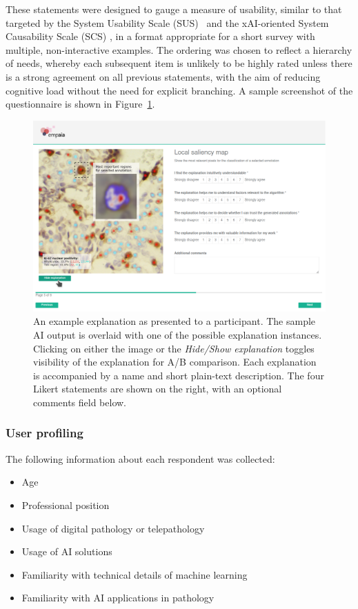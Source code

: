These statements were designed to gauge a measure of usability, similar to that targeted by the System Usability Scale (SUS)~\cite{brooke1996sus} and the xAI-oriented System Causability Scale (SCS) \cite{HolzingerEtAl:2020:QualityOfExplanations}, in a format appropriate for a short survey with multiple, non-interactive examples. The ordering was chosen to reflect a hierarchy of needs, whereby each subsequent item is unlikely to be highly rated unless there is a strong agreement on all previous statements, with the aim of reducing cognitive load without the need for explicit branching. A sample screenshot of the questionnaire is shown in Figure~\ref{fig:examplepage}.

 \begin{figure}[ht]
    \centering
    \includegraphics[width=0.75\linewidth]{Graphics/3CaseStudyDesign/example_page.png}
    \caption{An example explanation as presented to a participant. The sample AI output is overlaid with one of the possible explanation instances. Clicking on either the image or the \emph{Hide/Show explanation} toggles visibility of the explanation for A/B comparison. Each explanation is accompanied by a name and short plain-text description. The four Likert statements are shown on the right, with an optional comments field below.}
    \label{fig:examplepage}
 \end{figure}
 
\subsubsection{User profiling}

The following information about each respondent was collected:

\begin{itemize}[noitemsep]
    \item Age
    \item Professional position
    \item Usage of digital pathology or telepathology
    \item Usage of AI solutions
    \item Familiarity with technical details of machine learning
    \item Familiarity with AI applications in pathology
\end{itemize}

